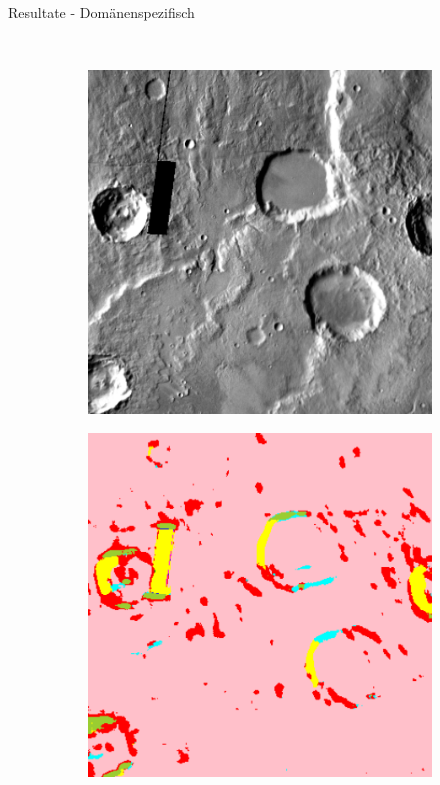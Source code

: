 \documentclass{beamer}
\begin{document}
\begin{frame}[allowframebreaks]{Resultate - Domänenspezifisch}
\begin{minipage}{0.38\textwidth}
\begin{figure}[h!]
\begin{subfigure}[t]{0.31\textwidth}
			\end{subfigure}\\
			\begin{subfigure}[t]{0.31\textwidth}
				\includegraphics[width=\linewidth,keepaspectratio]{gfx/rob_in/thm_dir_N-30_210.png_sourcetile_100.png}
			\end{subfigure}
			\begin{subfigure}[t]{0.31\textwidth}
				\includegraphics[width=\linewidth,keepaspectratio]{gfx/rob_res/thm_dir_N-30_210.png_tile_100.png}

\end{subfigure}
\end{figure}
\end{minipage}
\end{frame}
\end{document}
